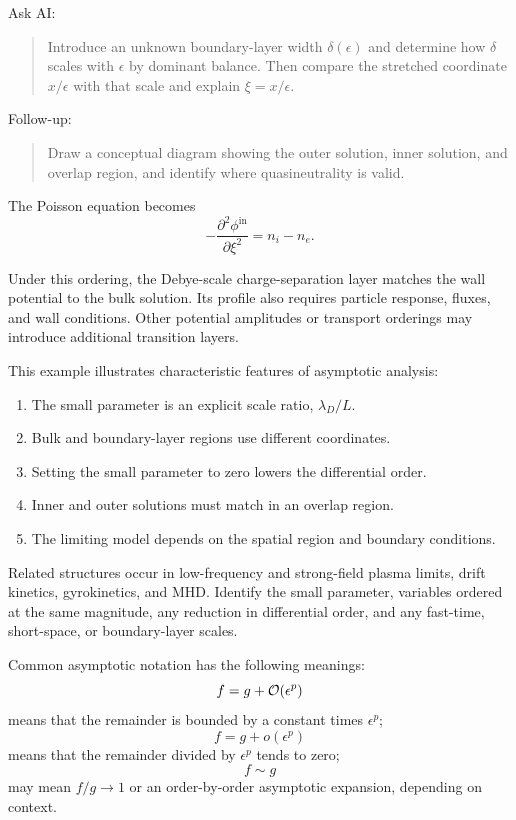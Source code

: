 \begin{askai}
Ask AI:
\begin{quote}
Introduce an unknown boundary-layer width \(\delta(\epsilon)\) and determine how \(\delta\) scales with \(\epsilon\) by dominant balance. Then compare the stretched coordinate \(x/\epsilon\) with that scale and explain \(\xi=x/\epsilon\).
\end{quote}

Follow-up:
\begin{quote}
Draw a conceptual diagram showing the outer solution, inner solution, and overlap region, and identify where quasineutrality is valid.
\end{quote}
\end{askai}

The Poisson equation becomes
\[
-\frac{\partial^2\phi^{\mathrm{in}}}{\partial\xi^2}
=
n_i-n_e.
\]

Under this ordering, the Debye-scale charge-separation layer matches the wall potential to the bulk solution. Its profile also requires particle response, fluxes, and wall conditions. Other potential amplitudes or transport orderings may introduce additional transition layers.

This example illustrates characteristic features of asymptotic analysis:
\begin{enumerate}
  \item The small parameter is an explicit scale ratio, \(\lambda_D/L\).
  \item Bulk and boundary-layer regions use different coordinates.
  \item Setting the small parameter to zero lowers the differential order.
  \item Inner and outer solutions must match in an overlap region.
  \item The limiting model depends on the spatial region and boundary conditions.
\end{enumerate}

Related structures occur in low-frequency and strong-field plasma limits, drift kinetics, gyrokinetics, and MHD. Identify the small parameter, variables ordered at the same magnitude, any reduction in differential order, and any fast-time, short-space, or boundary-layer scales.

Common asymptotic notation has the following meanings:
\[
f=g+\mathcal O(\epsilon^p)
\]
means that the remainder is bounded by a constant times \(\epsilon^p\);
\[
f=g+o(\epsilon^p)
\]
means that the remainder divided by \(\epsilon^p\) tends to zero;
\[
f\sim g
\]
may mean \(f/g\to1\) or an order-by-order asymptotic expansion, depending on context.

